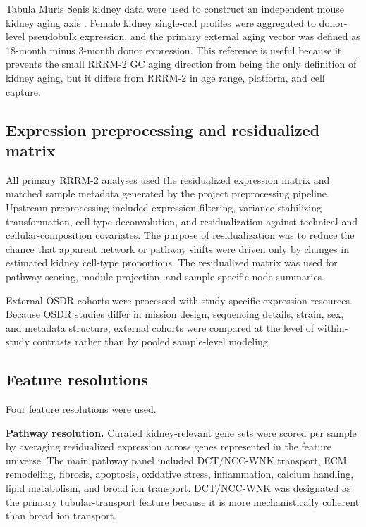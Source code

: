 \documentclass[11pt]{article}
\begin{document}
Tabula Muris Senis kidney data were used to construct an independent mouse kidney aging axis \citep{tabula2020}. Female kidney single-cell profiles were aggregated to donor-level pseudobulk expression, and the primary external aging vector was defined as 18-month minus 3-month donor expression. This reference is useful because it prevents the small RRRM-2 GC aging direction from being the only definition of kidney aging, but it differs from RRRM-2 in age range, platform, and cell capture.

\subsection{Expression preprocessing and residualized matrix}

All primary RRRM-2 analyses used the residualized expression matrix and matched sample metadata generated by the project preprocessing pipeline. Upstream preprocessing included expression filtering, variance-stabilizing transformation, cell-type deconvolution, and residualization against technical and cellular-composition covariates. The purpose of residualization was to reduce the chance that apparent network or pathway shifts were driven only by changes in estimated kidney cell-type proportions. The residualized matrix was used for pathway scoring, module projection, and sample-specific node summaries.

External OSDR cohorts were processed with study-specific expression resources. Because OSDR studies differ in mission design, sequencing details, strain, sex, and metadata structure, external cohorts were compared at the level of within-study contrasts rather than by pooled sample-level modeling.

\subsection{Feature resolutions}

Four feature resolutions were used.

\textbf{Pathway resolution.} Curated kidney-relevant gene sets were scored per sample by averaging residualized expression across genes represented in the feature universe. The main pathway panel included DCT/NCC-WNK transport, ECM remodeling, fibrosis, apoptosis, oxidative stress, inflammation, calcium handling, lipid metabolism, and broad ion transport. DCT/NCC-WNK was designated as the primary tubular-transport feature because it is more mechanistically coherent than broad ion transport.
\end{document}
